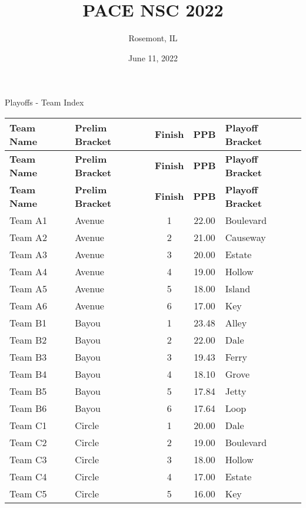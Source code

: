 \documentclass{article}%
\title{PACE NSC 2022}%
\author{Rosemont, IL}%
\date{June 11, 2022}%
\begin{document}
%
\normalsize%
%
\maketitle%
\vspace*{48pt}%
\begin{center}%
\begin{Huge}%
Playoffs {-} Team Index%
\end{Huge}%
\end{center}%
\newpage%
\pagestyle{fancy}%
\fancyhf{}%
%
%
%
%
%
%
\begin{longtable}{|l|lcc|l|}%
\rowcolor{gray!30}%
\hline%
\textbf{Team Name} &\textbf{Prelim Bracket}&\textbf{Finish}&\textbf{PPB}&\textbf{Playoff Bracket}\\%
\hline%
\endhead%
\hline%
\rowcolor{gray!25}%
\textbf{Team Name} &\textbf{Prelim Bracket}&\textbf{Finish}&\textbf{PPB}&\textbf{Playoff Bracket}\\%
\hline%
\endfoot%
\hline%
\hline\rowcolor{gray!25}%
\textbf{Team Name} &\textbf{Prelim Bracket}&\textbf{Finish}&\textbf{PPB}&\textbf{Playoff Bracket}\\%
\hline%
\endlastfoot%
\hline%
Team A1&Avenue&1&22.00&Boulevard\\%
Team A2&Avenue&2&21.00&Causeway\\%
Team A3&Avenue&3&20.00&Estate\\%
Team A4&Avenue&4&19.00&Hollow\\%
Team A5&Avenue&5&18.00&Island\\%
Team A6&Avenue&6&17.00&Key\\%
Team B1&Bayou&1&23.48&Alley\\%
Team B2&Bayou&2&22.00&Dale\\%
Team B3&Bayou&3&19.43&Ferry\\%
Team B4&Bayou&4&18.10&Grove\\%
Team B5&Bayou&5&17.84&Jetty\\%
Team B6&Bayou&6&17.64&Loop\\%
Team C1&Circle&1&20.00&Dale\\%
Team C2&Circle&2&19.00&Boulevard\\%
Team C3&Circle&3&18.00&Hollow\\%
Team C4&Circle&4&17.00&Estate\\%
Team C5&Circle&5&16.00&Key\\%

\end{longtable}
\end{document}
